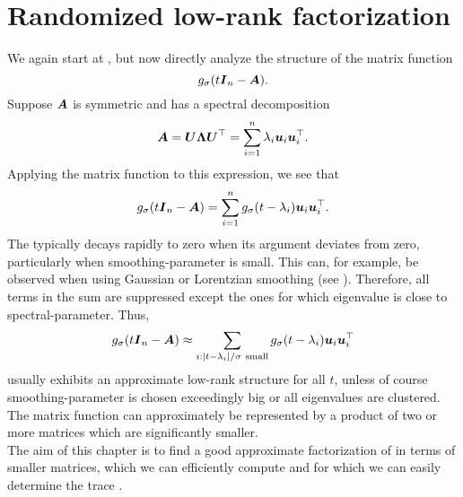 \chapter{Randomized low-rank factorization}
\label{chp:3-nystrom}

We again start at , but now
directly analyze the structure of the matrix function
\begin{equation}
    g_{\sigma}(t\boldsymbol{I}_n - \boldsymbol{A}).
    \label{equ:3-nystrom-matrix-function}
\end{equation}
Suppose $\boldsymbol{A}$ is symmetric and has a spectral decomposition
\begin{equation}
    \boldsymbol{A}
        = \boldsymbol{U} \boldsymbol{\Lambda} \boldsymbol{U}^{\top} 
        = \sum_{i=1}^n \lambda_i \boldsymbol{u}_i \boldsymbol{u}_i^{\top}.
    \label{equ:3-nystrom-matrix-spectral-decomposition}
\end{equation}
Applying the matrix function to this expression, we see that
\begin{equation}
    g_{\sigma}(t\boldsymbol{I}_n - \boldsymbol{A})
        = \sum_{i=1}^n g_{\sigma}(t - \lambda_i) \boldsymbol{u}_i \boldsymbol{u}_i^{\top}.
    \label{equ:3-nystrom-matrix-function-spectral-decomposition}
\end{equation}
The  typically decays
rapidly to zero when its argument deviates from zero, particularly when
\gls{smoothing-parameter} is small. This can, for example, be observed when using Gaussian
or Lorentzian smoothing (see ).
Therefore, all terms in the sum 
are suppressed except the ones for which \gls{eigenvalue} is close to \gls{spectral-parameter}.
Thus,
\begin{equation}
    g_{\sigma}(t\boldsymbol{I}_n - \boldsymbol{A})
        \approx \sum_{i: |t - \lambda_i|/\sigma~\text{small}} g_{\sigma}(t - \lambda_i) \boldsymbol{u}_i \boldsymbol{u}_i^{\top}
    \label{equ:3-nystrom-matrix-function-low-rank-approximation}
\end{equation}
usually exhibits an approximate low-rank structure for all $t$, unless of course \gls{smoothing-parameter} is chosen exceedingly big or all eigenvalues
are clustered. The matrix function can approximately 
be represented by a product of two or more matrices which are significantly smaller.\\

The aim of this chapter is to find a good approximate factorization of 
in terms of smaller matrices, which we can efficiently compute and for which we can
easily determine the trace .

